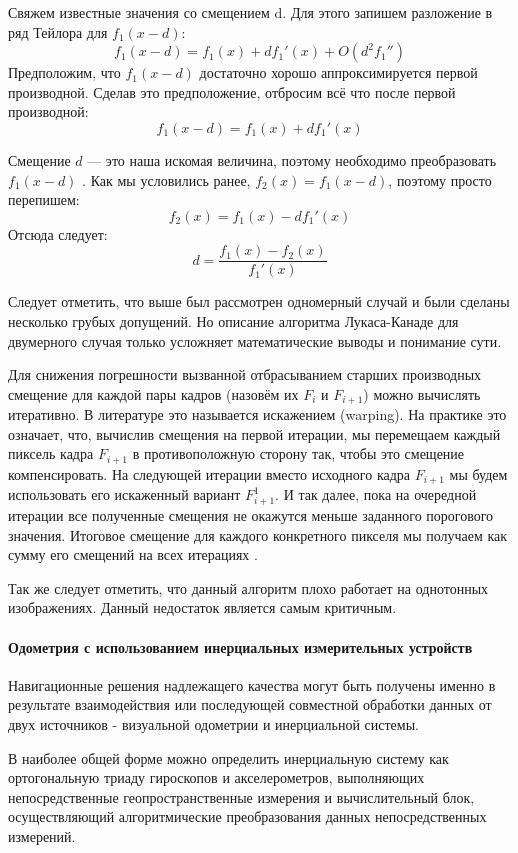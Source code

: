 Свяжем известные значения со смещением d. Для этого запишем разложение в ряд Тейлора для $ f_1 (x-d)$:
$$  f_1 (x-d) =f_1(x) + df_1'(x) + O(d^2f_1'') $$
Предположим, что $ f_1 (x-d)$ достаточно хорошо аппроксимируется первой производной. Сделав это предположение, отбросим всё что после первой производной:
$$  f_1 (x-d) =f_1(x) + df_1'(x) $$

Смещение $d$ — это наша искомая величина, поэтому необходимо преобразовать $ f_1 (x-d)$ . Как мы условились ранее, $ f_2(x) = f_1 (x-d) $, поэтому просто перепишем:
$$ f_2(x)= f_1(x) - df_1'(x) $$
Отсюда следует:
$$ d = \frac{f_1(x)-f_2(x)}{f_1'(x)} $$

Следует отметить, что выше был рассмотрен одномерный случай и были сделаны несколько грубых допущений. Но описание алгоритма Лукаса-Канаде для двумерного случая только усложняет математические выводы и понимание сути. 

Для снижения погрешности вызванной отбрасыванием старших производных смещение для каждой пары кадров (назовём их $F_i$ и $F_{i+1}$) можно вычислять итеративно. В литературе это называется искажением (warping). На практике это означает, что, вычислив смещения на первой итерации, мы перемещаем каждый пиксель кадра $F_{i+1}$ в противоположную сторону так, чтобы это смещение компенсировать. На следующей итерации вместо исходного кадра $F_{i+1}$ мы будем использовать его искаженный вариант $F_{i+1}^1$. И так далее, пока на очередной итерации все полученные смещения не окажутся меньше заданного порогового значения. Итоговое смещение для каждого конкретного пикселя мы получаем как сумму его смещений на всех итерациях \cite{habrOpticalFlowTheory}.

Так же следует отметить, что данный алгоритм плохо работает на однотонных изображениях. Данный недостаток является самым критичным. 

\paragraph{Одометрия с использованием инерциальных измерительных устройств}
Навигационные решения надлежащего качества могут быть получены именно в результате взаимодействия или последующей совместной обработки данных от двух  источников - визуальной одометрии и инерциальной системы.  

В наиболее общей форме можно определить инерциальную систему как ортогональную триаду гироскопов и акселерометров, выполняющих непосредственные геопространственные измерения и вычислительный блок, осуществляющий алгоритмические преобразования данных непосредственных измерений.

